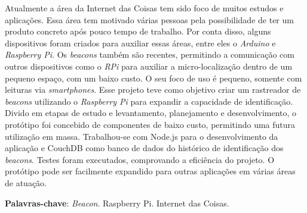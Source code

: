 \documentclass[
		12pt,				%
		openright,			%
		oneside,			%
		a4paper,			%
		chapter=TITLE,		%
		english,			%
		brazil				%
	]{abntex2}
\newif\iffinal
\newif\ifresumo
\begin{document}
\iffinal
	\begin{epigrafe}
		\vspace*{\fill}
			\begin{flushright}
			\textit{"Que eu não perca a vontade de ajudar as pessoas, \\
				mesmo sabendo que muitas delas são incapazes \\
				de ver, reconhecer e retribuir esta ajuda."\\
				(Francisco Cândido Xavier)}
		\end{flushright}
	\end{epigrafe}
\fi


\ifresumo
	\setlength{\absparsep}{18pt} %
	\begin{resumo}

		Atualmente a área da Internet das Coisas tem sido foco de muitos estudos e aplicações. Essa área tem motivado várias pessoas pela possibilidade de ter um produto concreto após pouco tempo de trabalho. Por conta disso, alguns dispositivos foram criados para auxiliar essas áreas, entre eles o \textit{Arduino} e \textit{Raspberry Pi}. Os \textit{beacons} também são recentes, permitindo a comunicação com outros dispositivos como o \textit{RPi} para auxiliar a micro-localização dentro de um pequeno espaço, com um baixo custo. O seu foco de uso é pequeno, somente com leituras via \textit{smartphones}. Esse projeto teve como objetivo criar um rastreador de \textit{beacons} utilizando o \textit{Raspberry Pi} para expandir a capacidade de identificação. Divido em etapas de estudo e levantamento, planejamento e desenvolvimento, o protótipo foi concebido de componentes de baixo custo, permitindo uma futura utilização em massa. Trabalhou-se com Node.js para o desenvolvimento da aplicação e CouchDB como banco de dados do histórico de identificação dos \textit{beacons}. Testes foram executados, comprovando a eficiência do projeto. O protótipo pode ser facilmente expandido para outras  aplicações em várias áreas de atuação.

 			\textbf{Palavras-chave}: \textit{Beacon}. Raspberry Pi. Internet das Coisas.
 			
	\end{resumo}
	
\end{document}
